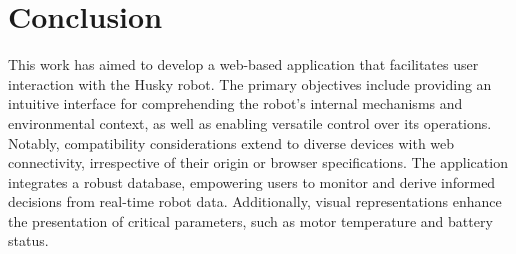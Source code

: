 \documentclass[conference]{IEEEtran}
\begin{document}
\section{Conclusion}
This work has aimed to develop a web-based application that facilitates user interaction with the Husky robot. The primary objectives include providing an intuitive interface for comprehending the robot’s internal mechanisms and environmental context, as well as enabling versatile control over its operations. 
Notably, compatibility considerations extend to diverse devices with web connectivity, irrespective of their origin or browser specifications. The application integrates a robust database, empowering users to monitor and derive informed decisions from real-time robot data. 
Additionally, visual representations enhance the presentation of critical parameters, such as motor temperature and battery status.
\end{document}
